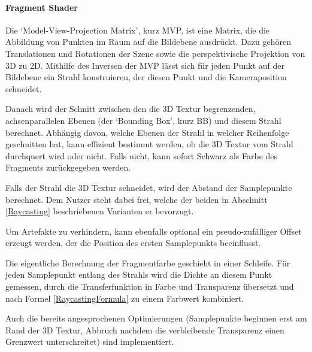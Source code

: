 \documentclass[a4paper,fontsize=12pt,toc=bib,halfparskip]{scrartcl}
\begin{document}
\paragraph{Fragment Shader}
Die `Model-View-Projection Matrix', kurz MVP, ist eine Matrix, die die Abbildung von Punkten im Raum auf die Bildebene ausdr\"uckt. Dazu geh\"oren Translationen und Rotationen der Szene sowie die perspektivische Projektion von 3D zu 2D. Mithilfe des Inversen der MVP l\"asst sich f\"ur jeden Punkt auf der Bildebene ein Strahl konstruieren, der diesen Punkt und die Kameraposition schneidet. 

Danach wird der Schnitt zwischen den die 3D Textur begrenzenden, achsenparallelen Ebenen (der `Bounding Box', kurz BB) und diesem Strahl berechnet. Abh\"angig davon, welche Ebenen der Strahl in welcher Reihenfolge geschnitten hat, kann effizient bestimmt werden, ob die 3D Textur vom Strahl durchquert wird oder nicht. Falls nicht, kann sofort Schwarz als Farbe des Fragments zur\"uckgegeben werden.

Falls der Strahl die 3D Textur schneidet, wird der Abstand der Samplepunkte berechnet. Dem Nutzer steht dabei frei, welche der beiden in Abschnitt \ref{Raycasting} beschriebenen Varianten er bevorzugt. 

Um Artefakte zu verhindern, kann ebenfalls optional ein pseudo-zuf\"alliger Offset erzeugt werden, der die Position des ersten Samplepunkts beeinflusst.

Die eigentliche Berechnung der Fragmentfarbe geschieht in einer Schleife. F\"ur jeden Samplepunkt entlang des Strahls wird die Dichte an diesem Punkt gemessen, durch die Transferfunktion in Farbe und Transparenz  \"ubersetzt und nach Formel \ref{RaycastingFormula} zu einem Farbwert kombiniert. 

Auch die bereits angesprochenen Optimierungen (Samplepunkte beginnen erst am Rand der 3D Textur, Abbruch nachdem die verbleibende Transparenz einen Grenzwert unterschreitet) sind implementiert.
\end{document}
